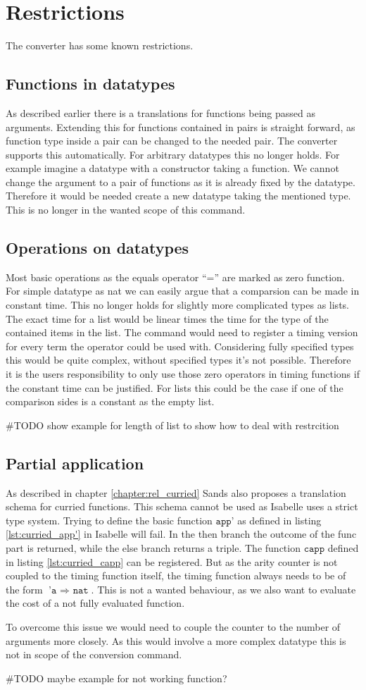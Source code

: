 
\section{Restrictions} \label{chapter:restrictions}
The converter has some known restrictions.

\subsection{Functions in datatypes}
As described earlier there is a translations for functions being passed as arguments.
Extending this for functions contained in pairs is straight forward, as function type inside a pair can be changed to the needed pair.
The converter supports this automatically.
For arbitrary datatypes this no longer holds.
For example imagine a datatype with a constructor taking a function.
We cannot change the argument to a pair of functions as it is already fixed by the datatype.
Therefore it would be needed create a new datatype taking the mentioned type.
This is no longer in the wanted scope of this command.

\subsection{Operations on datatypes} \label{chapter:nonconstant_zeros}
Most basic operations as the equals operator ``='' are marked as zero function.
For simple datatype as nat we can easily argue that a comparsion can be made in constant time.
This no longer holds for slightly more complicated types as lists.
The exact time for a list would be linear times the time for the type of the contained items in the list.
The command would need to register a timing version for every term the operator could be used with.
Considering fully specified types this would be quite complex, without specified types it's not possible.
Therefore it is the users responsibility to only use those zero operators in timing functions if the constant time can be justified.
For lists this could be the case if one of the comparison sides is a constant as the empty list.

\#TODO show example for length of list to show how to deal with restrcition

\subsection{Partial application}
As described in chapter \ref{chapter:rel_curried} Sands also proposes a translation schema for curried functions.
This schema cannot be used as Isabelle uses a strict type system.
Trying to define the basic function $\texttt{app'}$ as defined in listing \ref{lst:curried_app'} in Isabelle will fail.
In the then branch the outcome of the func part is returned, while the else branch returns a triple.
The function $\texttt{capp}$ defined in listing \ref{lst:curried_capp} can be registered.
But as the arity counter is not coupled to the timing function itself, the timing function always needs to be of the form $\texttt{'a $\Rightarrow$ nat}$.
This is not a wanted behaviour, as we also want to evaluate the cost of a not fully evaluated function.

To overcome this issue we would need to couple the counter to the number of arguments more closely.
As this would involve a more complex datatype this is not in scope of the conversion command.

\#TODO maybe example for not working function?
